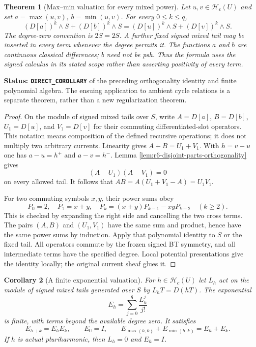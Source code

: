 \documentclass[11pt,a4paper]{article}
\numberwithin{equation}{section}
\newtheorem{theorem}{Theorem}[section]
\newtheorem{corollary}[theorem]{Corollary}
\theoremstyle{definition}
\theoremstyle{remark}
\begin{document}
\begin{theorem}[Max--min valuation for every mixed power]
\label{thm:r6-max-min-valuation}
Let $u,v\in\mathscr H_c(U)$ and set
$a=\max(u,v)$, $b=\min(u,v)$. For every $0\leq k\leq q$,
\begin{equation}
 (D[a])^k\wedge S+(D[b])^k\wedge S
       =(D[u])^k\wedge S+(D[v])^k\wedge S.
 \label{eq:r6-max-min-valuation}
\end{equation}
The degree-zero convention is $2S=2S$. A further fixed
signed mixed tail may be inserted in every term whenever
the degree permits it. The functions $a$ and $b$ are
continuous classical differences; $b$ need not be psh.
Thus the formula uses the signed calculus in its stated
scope rather than asserting positivity of every term.
\end{theorem}

\noindent\textbf{Status: \texttt{DIRECT\_COROLLARY}} of the
preceding orthogonality identity and finite polynomial algebra.
The ensuing application to ambient cycle relations is a
separate theorem, rather than a new regularization theorem.

\begin{proof}
On the module of signed mixed tails over $S$, write
$A=D[a]$, $B=D[b]$, $U_1=D[u]$, and $V_1=D[v]$ for their
commuting differentiated-slot operators. This notation
means composition of the defined recursive operations;
it does not multiply two arbitrary currents. Linearity
gives $A+B=U_1+V_1$. With $h=v-u$ one has
$a-u=h^+$ and $a-v=h^-$. Lemma
\ref{lem:r6-disjoint-parts-orthogonality} gives
\[
                   (A-U_1)(A-V_1)=0
\]
on every allowed tail. It follows that
$AB=A(U_1+V_1-A)=U_1V_1$.

For two commuting symbols $x,y$, their power sums obey
\[
 P_0=2,\quad P_1=x+y,\quad
 P_k=(x+y)P_{k-1}-xyP_{k-2}\quad(k\geq2).
\]
This is checked by expanding the right side and cancelling
the two cross terms. The pairs $(A,B)$ and $(U_1,V_1)$
have the same sum and product, hence have the same power
sums by induction. Apply that polynomial identity to $S$
or the fixed tail. All operators commute by the frozen
signed BT symmetry, and all intermediate terms have the
specified degree. Local potential presentations give the
identity locally; the original current sheaf glues it.
\end{proof}

\begin{corollary}[A finite exponential valuation]
\label{cor:r6-exponential-valuation}
For $h\in\mathscr H_c(U)$ let $L_h$ act on the module of
signed mixed tails generated over $S$ by
$L_h T=D(hT)$. The exponential
\[
                 E_h=\sum_{j=0}^{q}\frac{L_h^j}{j!}
\]
is finite, with terms beyond the available degree zero.
It satisfies
\[
 E_{h+k}=E_hE_k,\qquad E_0=I,
 \qquad E_{\max(h,k)}+E_{\min(h,k)}=E_h+E_k.
\]
If $h$ is actual pluriharmonic, then $L_h=0$ and $E_h=I$.
\end{corollary}
\end{document}
